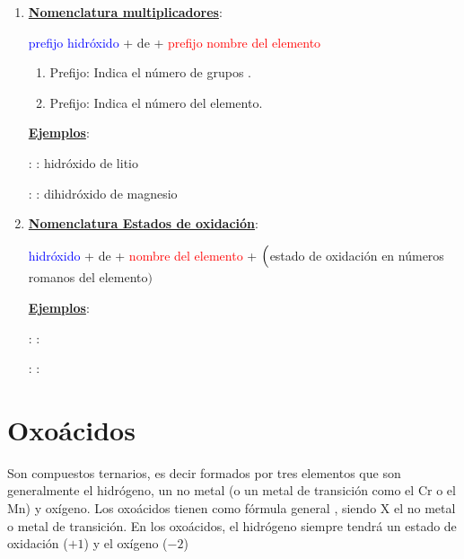 \documentclass[11pt, a4paper]{article}
\begin{document}
\begin{enumerate}[label=\itembolascolor{\arabic*}{blue}]
    \item \textbf{\uline{Nomenclatura multiplicadores}}:
          \begin{center}
              \textcolor{blue}{prefijo hidróxido} + de + \textcolor{red}{prefijo nombre del elemento}
          \end{center}

          \begin{enumerate}[label=\textcolor{red}{$\bullet$}]
              \item Prefijo: Indica el número de grupos .
              \item Prefijo: Indica el número del elemento.
          \end{enumerate}

          \textbf{\uline{Ejemplos}}:

           : : hidróxido de litio

           : : dihidróxido de magnesio

    \item \textbf{\uline{Nomenclatura Estados de oxidación}}:
          \begin{center}
              \textcolor{blue}{hidróxido} + de + \textcolor{red}{nombre del elemento} + $\Bigl($\textcolor{green!50!black}{estado de oxidación en números romanos del elemento}$\Bigr)$
          \end{center}

          \textbf{\uline{Ejemplos}}:

           : : 

           : : 

\end{enumerate}
\newpage

\section{Oxoácidos}

Son compuestos ternarios, es decir formados por tres elementos que son generalmente el hidrógeno, un no metal (o un metal de transición como el Cr o el Mn) y oxígeno. Los oxoácidos tienen como fórmula general , siendo X el no metal o metal de transición. En los oxoácidos, el hidrógeno siempre tendrá un estado de oxidación ($+1$) y el oxígeno ($-2$)
\end{document}
